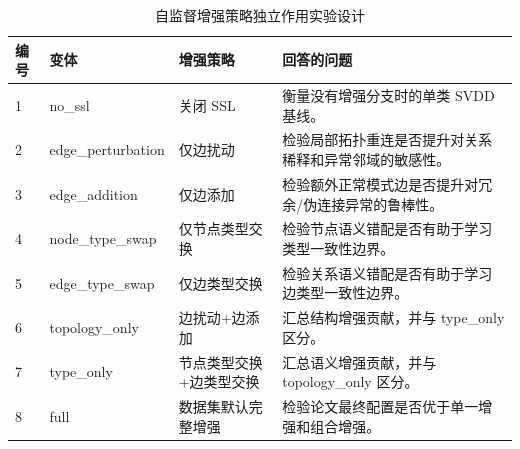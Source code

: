 \begin{table}[t]
\centering
\scriptsize
\renewcommand{\arraystretch}{1.05}
\caption{自监督增强策略独立作用实验设计}
\label{tab:ssl_augmentation_plan}
\begin{tabularx}{\textwidth}{lllX}
\toprule
编号 & 变体 & 增强策略 & 回答的问题 \\
\midrule
1 & no\_ssl & 关闭 SSL & 衡量没有增强分支时的单类 SVDD 基线。 \\
2 & edge\_perturbation & 仅边扰动 & 检验局部拓扑重连是否提升对关系稀释和异常邻域的敏感性。 \\
3 & edge\_addition & 仅边添加 & 检验额外正常模式边是否提升对冗余/伪连接异常的鲁棒性。 \\
4 & node\_type\_swap & 仅节点类型交换 & 检验节点语义错配是否有助于学习类型一致性边界。 \\
5 & edge\_type\_swap & 仅边类型交换 & 检验关系语义错配是否有助于学习边类型一致性边界。 \\
6 & topology\_only & 边扰动+边添加 & 汇总结构增强贡献，并与 type\_only 区分。 \\
7 & type\_only & 节点类型交换+边类型交换 & 汇总语义增强贡献，并与 topology\_only 区分。 \\
8 & full & 数据集默认完整增强 & 检验论文最终配置是否优于单一增强和组合增强。 \\
\bottomrule
\end{tabularx}
\end{table}
